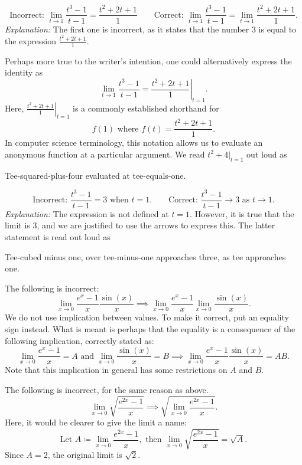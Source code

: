 \begin{example}
\[
\text{Incorrect: } 
\lim_{t\to 1} \frac{t^3-1}{t-1}  = \frac{t^2+2t+1}{1}
\qquad 
\text{Correct: } 
\lim_{t\to 1} \frac{t^3-1}{t-1} = \lim_{t\to 1} \frac{t^2+2t+1}{1}.
\]
\emph{Explanation:} The first one is incorrect, as it states that the number
$3$ is equal to the expression $\frac{t^2+2t+1}{1}$.

Perhaps more true to the writer's intention, one could alternatively express
the identity as
\[
\lim_{t\to 1} \frac{t^3-1}{t-1}  = \left. \frac{t^2+2t+1}{1} \right\vert_{t=1}.
\]
Here, $\left. \frac{t^2+2t+1}{1} \right\vert_{t=1}$ is a commonly established
shorthand for
\[
f(1) \text{ where } f(t) = \frac{t^2+2t+1}{1}.
\]
In computer science terminology, this notation allows us to evaluate an
anonymous function at a particular argument.
We read $t^2+4\vert_{t=1}$ out loud as
\begin{blockquote}
Tee-squared-plus-four evaluated at tee-equals-one.
\end{blockquote}

\end{example}


\begin{example}
\[
\text{Incorrect: } 
 \frac{t^3-1}{t-1}  = 3 \text{ when $t=1$}.
\qquad 
\text{Correct: } 
\frac{t^3-1}{t-1}  \to 3 \text{ as $t\to 1$}.
\]
\emph{Explanation:} The expression is not defined at $t=1$.  However, it is
true that the limit is $3$,
and we are justified to use the arrows to express this. The latter statement is read out loud as
\begin{blockquote}
Tee-cubed minus one, over tee-minus-one approaches three, as tee approaches one.
\end{blockquote}

\end{example}


\begin{example}
The following is incorrect:
\[
 \lim_{x\to 0} \frac{e^x-1}{x} \frac{\sin(x)}{x} \implies
 \lim_{x\to 0} \frac{e^x-1}{x} \lim_{x\to 0} \frac{\sin(x)}{x}.
\]
We do not use implication between values. To make it correct, put an equality sign instead.
What is meant is perhaps that the equality is a consequence of the following implication,
correctly stated as:
\[
 \lim_{x\to 0} \frac{e^x-1}{x} = A
 \text{ and }
 \lim_{x\to 0} \frac{\sin(x)}{x}=B
 \implies
 \lim_{x\to 0} \frac{e^x-1}{x} \frac{\sin(x)}{x} = AB.
\]
Note that this implication in general has some restrictions on $A$ and $B$.
\end{example}


\begin{example}
The following is incorrect, for the same reason as above.
\[
 \lim_{x\to 0} \sqrt{ \frac{e^{2x}-1}{x} } \implies
 \sqrt{\lim_{x\to 0} \frac{e^{2x}-1}{x} }.
\]
Here, it would be clearer to give the limit a name:
\[
\text{Let } A \coloneqq \lim_{x\to 0} \frac{e^{2x}-1}{x},
\text{ then }
\lim_{x\to 0} \sqrt{\frac{e^{2x}-1}{x}} = \sqrt{A}.
\]
Since $A=2$, the original limit is $\sqrt{2}$.
\end{example}
